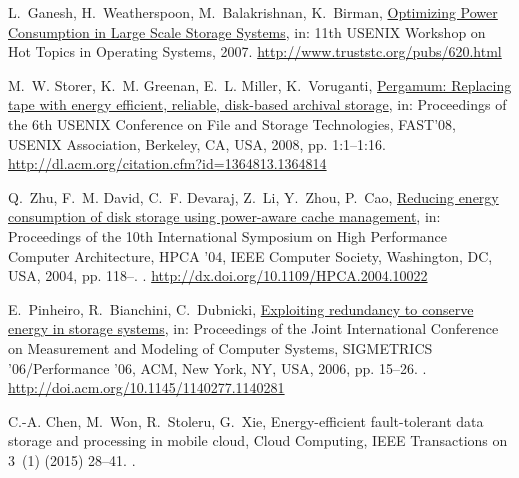 \documentclass[preprint,12pt]{elsarticle}
\begin{document}
\begin{thebibliography}{10}
L.~Ganesh, H.~Weatherspoon, M.~Balakrishnan, K.~Birman,
  \href{http://www.truststc.org/pubs/620.html}{{Optimizing Power Consumption in
  Large Scale Storage Systems}}, in: 11th USENIX Workshop on Hot Topics in
  Operating Systems, 2007.
\newline\urlprefix\url{http://www.truststc.org/pubs/620.html}

M.~W. Storer, K.~M. Greenan, E.~L. Miller, K.~Voruganti,
  \href{http://dl.acm.org/citation.cfm?id=1364813.1364814}{Pergamum: Replacing
  tape with energy efficient, reliable, disk-based archival storage}, in:
  Proceedings of the 6th USENIX Conference on File and Storage Technologies,
  FAST'08, USENIX Association, Berkeley, CA, USA, 2008, pp. 1:1--1:16.
\newline\urlprefix\url{http://dl.acm.org/citation.cfm?id=1364813.1364814}

Q.~Zhu, F.~M. David, C.~F. Devaraj, Z.~Li, Y.~Zhou, P.~Cao,
  \href{http://dx.doi.org/10.1109/HPCA.2004.10022}{Reducing energy consumption
  of disk storage using power-aware cache management}, in: Proceedings of the
  10th International Symposium on High Performance Computer Architecture, HPCA
  '04, IEEE Computer Society, Washington, DC, USA, 2004, pp. 118--.
\newblock \href {http://dx.doi.org/10.1109/HPCA.2004.10022}
  {}.
\newline\urlprefix\url{http://dx.doi.org/10.1109/HPCA.2004.10022}

E.~Pinheiro, R.~Bianchini, C.~Dubnicki,
  \href{http://doi.acm.org/10.1145/1140277.1140281}{Exploiting redundancy to
  conserve energy in storage systems}, in: Proceedings of the Joint
  International Conference on Measurement and Modeling of Computer Systems,
  SIGMETRICS '06/Performance '06, ACM, New York, NY, USA, 2006, pp. 15--26.
\newblock \href {http://dx.doi.org/10.1145/1140277.1140281}
  {}.
\newline\urlprefix\url{http://doi.acm.org/10.1145/1140277.1140281}

C.-A. Chen, M.~Won, R.~Stoleru, G.~Xie, Energy-efficient fault-tolerant data
  storage and processing in mobile cloud, Cloud Computing, IEEE Transactions on
  3~(1) (2015) 28--41.
\newblock \href {http://dx.doi.org/10.1109/TCC.2014.2326169}
  {}.


\end{thebibliography}
\end{document}
